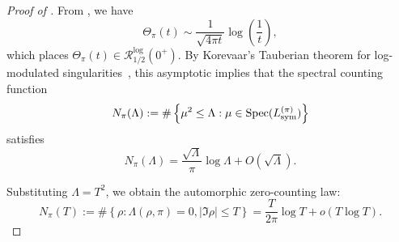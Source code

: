 \begin{proof}[Proof of ]
From , we have
\[
\Theta_\pi(t) \sim \frac{1}{\sqrt{4\pi t}} \log\left( \frac{1}{t} \right),
\]
which places \( \Theta_\pi(t) \in \mathcal{R}_{1/2}^{\log}(0^+) \). By Korevaar’s Tauberian theorem for log-modulated singularities~\cite[Ch.~III]{Korevaar2004Tauberian}, this asymptotic implies that the spectral counting function
\[
N_\pi(\Lambda) := \#\left\{ \mu^2 \le \Lambda : \mu \in \operatorname{Spec}({L_{\mathrm{sym}}^{(\pi)}}) \right\}
\]
satisfies
\[
N_\pi(\Lambda) = \frac{\sqrt{\Lambda}}{\pi} \log \Lambda + O(\sqrt{\Lambda}).
\]

Substituting \( \Lambda = T^2 \), we obtain the automorphic zero-counting law:
\[
N_\pi(T) := \#\left\{ \rho : \Lambda(\rho, \pi) = 0, |\Im \rho| \le T \right\}
= \frac{T}{2\pi} \log T + o(T \log T).
\]
\end{proof}
